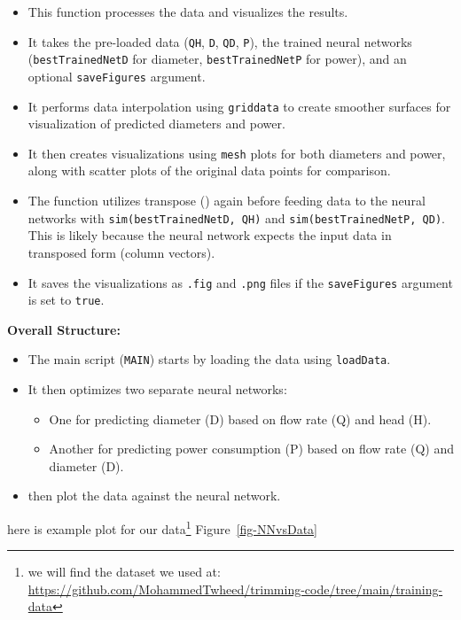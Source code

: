 \documentclass[
  super,
  review,
  3p]{elsarticle}
\providecommand{\tightlist}{%
  \setlength{\itemsep}{0pt}\setlength{\parskip}{0pt}}\usepackage{longtable,booktabs,array}
\begin{document}
\begin{itemize}
\tightlist
\item
  This function processes the data and visualizes the results.
\item
  It takes the pre-loaded data (\texttt{QH}, \texttt{D}, \texttt{QD},
  \texttt{P}), the trained neural networks (\texttt{bestTrainedNetD} for
  diameter, \texttt{bestTrainedNetP} for power), and an optional
  \texttt{saveFigures} argument.
\item
  It performs data interpolation using \texttt{griddata} to create
  smoother surfaces for visualization of predicted diameters and power.
\item
  It then creates visualizations using \texttt{mesh} plots for both
  diameters and power, along with scatter plots of the original data
  points for comparison.
\item
  The function utilizes transpose (\texttt{\textquotesingle{}}) again
  before feeding data to the neural networks with
  \texttt{sim(bestTrainedNetD,\ QH\textquotesingle{})} and
  \texttt{sim(bestTrainedNetP,\ QD\textquotesingle{})}. This is likely
  because the neural network expects the input data in transposed form
  (column vectors).
\item
  It saves the visualizations as \texttt{.fig} and \texttt{.png} files
  if the \texttt{saveFigures} argument is set to \texttt{true}.
\end{itemize}

\textbf{Overall Structure:}

\begin{itemize}
\tightlist
\item
  The main script (\texttt{MAIN}) starts by loading the data using
  \texttt{loadData}.
\item
  It then optimizes two separate neural networks:

  \begin{itemize}
  \tightlist
  \item
    One for predicting diameter (D) based on flow rate (Q) and head (H).
  \item
    Another for predicting power consumption (P) based on flow rate (Q)
    and diameter (D).
  \end{itemize}
\item
  then plot the data against the neural network.
\end{itemize}

here is example plot for our data\footnote{we will find the dataset we
  used at:
  \url{https://github.com/MohammedTwheed/trimming-code/tree/main/training-data}}
Figure~\ref{fig-NNvsData}
\end{document}
